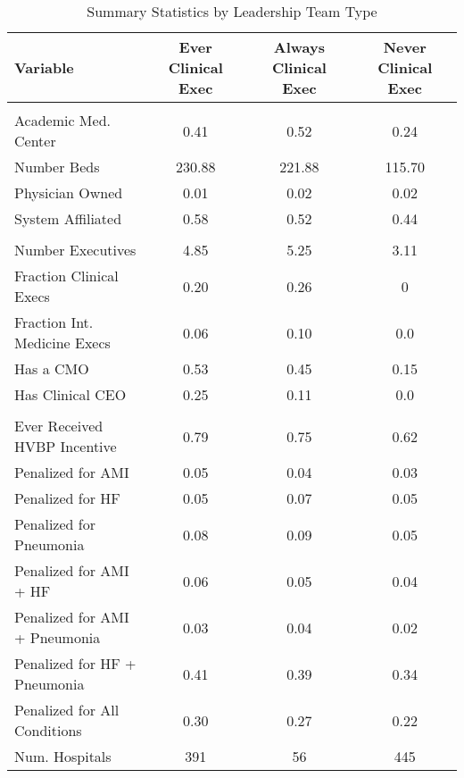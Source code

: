 \begin{table}[ht!]
\centering
\caption{\label{tab:sumstats_samples_stable}Summary Statistics by Leadership Team Type}
\centering
\begin{tabular}[t]{lccc}
\toprule
Variable & Ever Clinical Exec & Always Clinical Exec & Never Clinical Exec\\
\midrule
\addlinespace[0.3em]
\multicolumn{4}{l}{\textbf{Hospital Characteristics}}\\
\hspace{1em}Academic Med. Center & 0.41 & 0.52 & 0.24\\
\hspace{1em}Number Beds & 230.88 & 221.88 & 115.70\\
\hspace{1em}Physician Owned & 0.01 & 0.02 & 0.02\\
\hspace{1em}System Affiliated & 0.58 & 0.52 & 0.44\\
\addlinespace[0.3em]
\multicolumn{4}{l}{\textbf{Executive Team Characteristics}}\\
\hspace{1em}Number Executives & 4.85 & 5.25 & 3.11\\
\hspace{1em}Fraction Clinical Execs & 0.20 & 0.26 & 0\\
\hspace{1em}Fraction Int. Medicine Execs & 0.06 & 0.10 & 0.0\\
\hspace{1em}Has a CMO & 0.53 & 0.45 & 0.15\\
\hspace{1em}Has Clinical CEO & 0.25 & 0.11 & 0.0\\
\addlinespace[0.3em]
\multicolumn{4}{l}{\textbf{Penalty/Payment Variables}}\\
\hspace{1em}Ever Received HVBP Incentive & 0.79 & 0.75 & 0.62\\
\hspace{1em}Penalized for AMI & 0.05 & 0.04 & 0.03\\
\hspace{1em}Penalized for HF & 0.05 & 0.07 & 0.05\\
\hspace{1em}Penalized for Pneumonia & 0.08 & 0.09 & 0.05\\
\hspace{1em}Penalized for AMI + HF & 0.06 & 0.05 & 0.04\\
\hspace{1em}Penalized for AMI + Pneumonia & 0.03 & 0.04 & 0.02\\
\hspace{1em}Penalized for HF + Pneumonia & 0.41 & 0.39 & 0.34\\
\hspace{1em}Penalized for All Conditions & 0.30 & 0.27 & 0.22\\
Num. Hospitals & 391 & 56 & 445\\
\bottomrule
\end{tabular}
\end{table}
